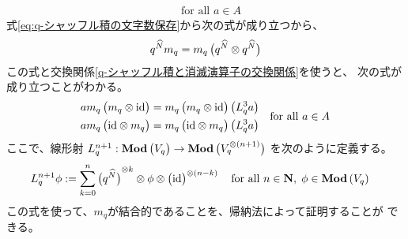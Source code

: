 {\begin{equation}
\begin{split}
		\quad\text{for all } a\in A
	\end{split}\end{equation}
	式\eqref{eq:q-シャッフル積の文字数保存}から次の式が成り立つから、
	\begin{equation*}\begin{split}
		q^{\Nhat}m_q = m_q\gplr{q^{\Nhat}\otimes q^{\Nhat}}
	\end{split}\end{equation*}
	この式と交換関係\eqref{q-シャッフル積と消滅演算子の交換関係}を使うと、
	次の式が成り立つことがわかる。
	\begin{equation*}\begin{split}
		am_q\gplr{m_q\otimes\id} &= m_q\gplr{m_q\otimes\id}\gplr{L_q^3a} \\
		am_q\gplr{\id\otimes m_q} &= m_q\gplr{\id\otimes m_q}\gplr{L_q^3a} \\
	\end{split}
		\quad\text{for all } a\in A
	\end{equation*}
	ここで、線形射
	$L_q^{n+1}:\cat{Mod}\gplr{V_q}\to\cat{Mod}\gplr{V_q^{\otimes(n+1)}}$
	を次のように定義する。
	\begin{equation*}\begin{split}
		L_q^{n+1}\phi &:= \sum_{k=0}^n \gplr{q^{\Nhat}}^{\otimes k}
			\otimes\phi\otimes\gplr{\id}^{\otimes(n-k)}
		\quad\text{for all } n\in\sizen,\; \phi\in\cat{Mod}\plr{V_q}
	\end{split}\end{equation*}
	この式を使って、$m_q$が結合的であることを、帰納法によって証明することが
	できる。
	
}
